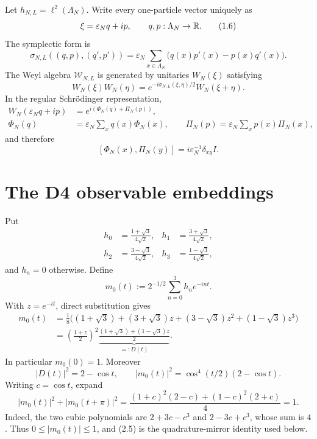 \documentclass[11pt,a4paper]{article}
\newcommand{\eps}{\varepsilon}
\newcommand{\W}{\mathcal W}
\begin{document}

Let \(h_{N,L}=\ell^2(\Lambda_N)\).  Write every one-particle vector uniquely as
\[
 \xi=\eps_Nq+ip,\qquad q,p:\Lambda_N\to\R.                     \tag{1.6}
\]
The symplectic form is
\[
 \sigma_{N,L}((q,p),(q',p'))
 =\eps_N\sum_{x\in\Lambda_N}\bigl(q(x)p'(x)-p(x)q'(x)\bigr).    \tag{1.7}
\]
The Weyl algebra \(\W_{N,L}\) is generated by unitaries \(W_N(\xi)\) satisfying
\[
 W_N(\xi)W_N(\eta)=e^{-i\sigma_{N,L}(\xi,\eta)/2}W_N(\xi+\eta). \tag{1.8}
\]
In the regular Schrödinger representation,
\begin{align}
 W_N(\eps_Nq+ip)&=e^{i(\Phi_N(q)+\Pi_N(p))},\\
 \Phi_N(q)&=\eps_N\sum_xq(x)\Phi_N(x),\qquad
 \Pi_N(p)=\eps_N\sum_xp(x)\Pi_N(x),                            \tag{1.9}
\end{align}
and therefore
\[
 [\Phi_N(x),\Pi_N(y)]=i\eps_N^{-1}\delta_{xy}I.                \tag{1.10}
\]

\section{The D4 observable embeddings}


Put
\begin{align}
 h_0&=\frac{1+\sqrt3}{4\sqrt2},&
 h_1&=\frac{3+\sqrt3}{4\sqrt2},\\
 h_2&=\frac{3-\sqrt3}{4\sqrt2},&
 h_3&=\frac{1-\sqrt3}{4\sqrt2},                               \tag{2.1}
\end{align}
and \(h_n=0\) otherwise.  Define
\[
 m_0(t):=2^{-1/2}\sum_{n=0}^3h_ne^{-i n t}.                     \tag{2.2}
\]
With \(z=e^{-it}\), direct substitution gives
\begin{align}
 m_0(t)
 &=\frac18\bigl((1+\sqrt3)+(3+\sqrt3)z+(3-\sqrt3)z^2
                 +(1-\sqrt3)z^3\bigr)\\
 &=\left(\frac{1+z}{2}\right)^2
   \underbrace{\frac{(1+\sqrt3)+(1-\sqrt3)z}{2}}_{=:D(t)}.     \tag{2.3}
\end{align}
In particular \(m_0(0)=1\).  Moreover
\[
 |D(t)|^2=2-\cos t,\qquad
 |m_0(t)|^2=\cos^4(t/2)(2-\cos t).                              \tag{2.4}
\]
Writing \(c=\cos t\), expand
\[
 |m_0(t)|^2+|m_0(t+\pi)|^2
 =\frac{(1+c)^2(2-c)+(1-c)^2(2+c)}4=1.                          \tag{2.5}
\]
Indeed, the two cubic polynomials are $2+3c-c^3$ and
$2-3c+c^3$, whose sum is $4$.
Thus \(0\le |m_0(t)|\le1\), and (2.5) is the quadrature-mirror
identity used below.
\end{document}
